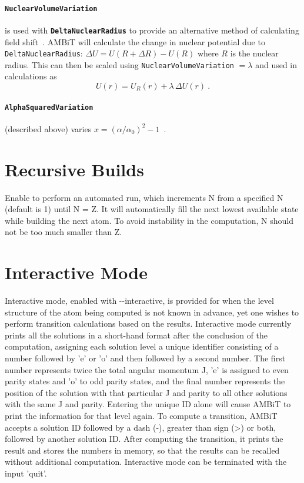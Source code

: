 \documentclass[a4paper,11pt]{article}
\newcommand{\option}[1]{\paragraph{\texttt{#1}}}
\begin{document}
\option{NuclearVolumeVariation} is used with \texttt{\textbf{DeltaNuclearRadius}} to provide an alternative method of calculating field shift~\cite{berengut03pra}. AMBiT will calculate the change in nuclear potential due to \texttt{DeltaNuclearRadius}: $\Delta U = U(R+\Delta R) - U(R)$ where $R$ is the nuclear radius. This can then be scaled using \texttt{NuclearVolumeVariation} $=\lambda$ and used in calculations as
\[
	U(r) = U_R(r) + \lambda\, \Delta U(r)\ .
\]

\option{AlphaSquaredVariation} (described above) varies $x = (\alpha/\alpha_0)^2-1$~\cite{dzuba99pra}.

\section{Recursive Builds}

Enable to perform an automated run, which increments N from a specified N (default is 1) until N = Z. It will automatically fill the next lowest available state while building the next atom. To avoid instability in the computation, N should not be too much smaller than Z.

\section{Interactive Mode}

Interactive mode, enabled with -{}-interactive, is provided for when the level structure of the atom being computed is not known in advance, yet one wishes to perform transition calculations based on the results. Interactive mode currently prints all the solutions in a short-hand format after the conclusion of the computation, assigning each solution level a unique identifier consisting of a number followed by 'e' or 'o' and then followed by a second number. The first number represents twice the total angular momentum J, 'e' is assigned to even parity states and 'o' to odd parity states, and the final number represents the position of the solution with that particular J and parity to all other solutions with the same J and parity. Entering the unique ID alone will cause AMBiT to print the information for that level again. To compute a transition, AMBiT accepts a solution ID followed by a dash (-), greater than sign (>) or both, followed by another solution ID. After computing the transition, it prints the result and stores the numbers in memory, so that the results can be recalled without additional computation. Interactive mode can be terminated with the input 'quit'.



\end{document}
